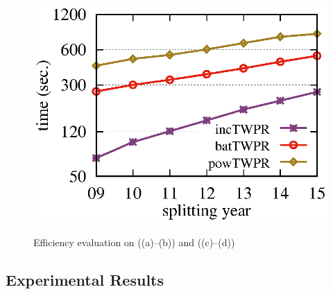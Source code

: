 \begin{figure}[tb!]
\begin{center}
{\includegraphics[scale=\graphscale]{./exp/MAG_time_twpr.eps}}
\hspace{0ex}
{}
\end{center}
\vspace{-1.5ex}
\caption{\small Efficiency evaluation on \aminer ((a)--(b)) and  \magdata ((c)--(d))}
\label{exp-time}
\vspace{-3ex}
\end{figure}

\subsection{Experimental Results}
\label{subsec-expres}

